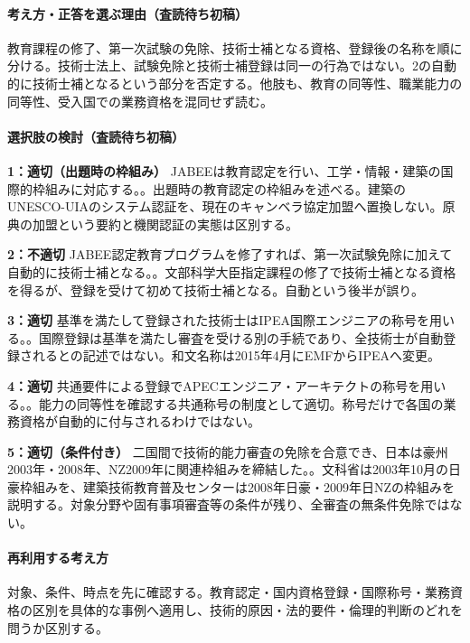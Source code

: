 \paragraph{考え方・正答を選ぶ理由（査読待ち初稿）} 教育課程の修了、第一次試験の免除、技術士補となる資格、登録後の名称を順に分ける。技術士法上、試験免除と技術士補登録は同一の行為ではない。2の自動的に技術士補となるという部分を否定する。他肢も、教育の同等性、職業能力の同等性、受入国での業務資格を混同せず読む。

\paragraph{選択肢の検討（査読待ち初稿）}\mbox{}\par

\noindent\textbf{1：適切（出題時の枠組み）} JABEEは教育認定を行い、工学・情報・建築の国際的枠組みに対応する。。出題時の教育認定の枠組みを述べる。建築のUNESCO-UIAのシステム認証を、現在のキャンベラ協定加盟へ置換しない。原典の加盟という要約と機関認証の実態は区別する。\par

\noindent\textbf{2：不適切} JABEE認定教育プログラムを修了すれば、第一次試験免除に加えて自動的に技術士補となる。。文部科学大臣指定課程の修了で技術士補となる資格を得るが、登録を受けて初めて技術士補となる。自動という後半が誤り。\par

\noindent\textbf{3：適切} 基準を満たして登録された技術士はIPEA国際エンジニアの称号を用いる。。国際登録は基準を満たし審査を受ける別の手続であり、全技術士が自動登録されるとの記述ではない。和文名称は2015年4月にEMFからIPEAへ変更。\par

\noindent\textbf{4：適切} 共通要件による登録でAPECエンジニア・アーキテクトの称号を用いる。。能力の同等性を確認する共通称号の制度として適切。称号だけで各国の業務資格が自動的に付与されるわけではない。\par

\noindent\textbf{5：適切（条件付き）} 二国間で技術的能力審査の免除を合意でき、日本は豪州2003年・2008年、NZ2009年に関連枠組みを締結した。。文科省は2003年10月の日豪枠組みを、建築技術教育普及センターは2008年日豪・2009年日NZの枠組みを説明する。対象分野や固有事項審査等の条件が残り、全審査の無条件免除ではない。\par

\paragraph{再利用する考え方} 対象、条件、時点を先に確認する。教育認定・国内資格登録・国際称号・業務資格の区別を具体的な事例へ適用し、技術的原因・法的要件・倫理的判断のどれを問うか区別する。

